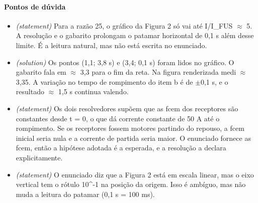 \documentclass{article}%
\begin{document}
\paragraph{Pontos de dúvida}%
\begin{itemize}%
\item%
\textit{(statement)} Para a razão 25, o gráfico da Figura 2 só vai até I/I\_FUS $\approx$ 5. A resolução e o gabarito prolongam o patamar horizontal de 0,1 s além desse limite. É a leitura natural, mas não está escrita no enunciado.%
\item%
\textit{(solution)} Os pontos (1,1; 3,8 s) e (3,4; 0,1 s) foram lidos no gráfico. O gabarito fala em $\approx$ 3,3 para o fim da reta. Na figura renderizada medi $\approx$ 3,35. A variação no tempo de rompimento do item b é de $\pm$0,1 s, e o resultado $\approx$ 1,5 s continua valendo.%
\item%
\textit{(statement)} Os dois resolvedores supõem que as fcem dos receptores são constantes desde t = 0, o que dá corrente constante de 50 A até o rompimento. Se os receptores fossem motores partindo do repouso, a fcem inicial seria nula e a corrente de partida seria maior. O enunciado fornece as fcem, então a hipótese adotada é a esperada, e a resolução a declara explicitamente.%
\item%
\textit{(statement)} O enunciado diz que a Figura 2 está em escala linear, mas o eixo vertical tem o rótulo 10\^{}{-}1 na posição da origem. Isso é ambíguo, mas não muda a leitura do patamar (0,1 s = 100 ms).%
\end{itemize}%
\end{document}
